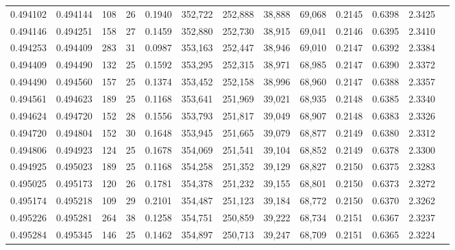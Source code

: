 \begin{tabular}{rrrrrrrrrrrrr}
0.494102 & 0.494144 & 108 &  26 &                                     0.1940 & 352,722 & 252,888 &  38,888 &  69,068 & 0.2145 & 0.6398 & 2.3425 \\
0.494146 & 0.494251 & 158 &  27 &                                     0.1459 & 352,880 & 252,730 &  38,915 &  69,041 & 0.2146 & 0.6395 & 2.3410 \\
0.494253 & 0.494409 & 283 &  31 &                                     0.0987 & 353,163 & 252,447 &  38,946 &  69,010 & 0.2147 & 0.6392 & 2.3384 \\
0.494409 & 0.494490 & 132 &  25 &                                     0.1592 & 353,295 & 252,315 &  38,971 &  68,985 & 0.2147 & 0.6390 & 2.3372 \\
0.494490 & 0.494560 & 157 &  25 &                                     0.1374 & 353,452 & 252,158 &  38,996 &  68,960 & 0.2147 & 0.6388 & 2.3357 \\
0.494561 & 0.494623 & 189 &  25 &                                     0.1168 & 353,641 & 251,969 &  39,021 &  68,935 & 0.2148 & 0.6385 & 2.3340 \\
0.494624 & 0.494720 & 152 &  28 &                                     0.1556 & 353,793 & 251,817 &  39,049 &  68,907 & 0.2148 & 0.6383 & 2.3326 \\
0.494720 & 0.494804 & 152 &  30 &                                     0.1648 & 353,945 & 251,665 &  39,079 &  68,877 & 0.2149 & 0.6380 & 2.3312 \\
0.494806 & 0.494923 & 124 &  25 &                                     0.1678 & 354,069 & 251,541 &  39,104 &  68,852 & 0.2149 & 0.6378 & 2.3300 \\
0.494925 & 0.495023 & 189 &  25 &                                     0.1168 & 354,258 & 251,352 &  39,129 &  68,827 & 0.2150 & 0.6375 & 2.3283 \\
0.495025 & 0.495173 & 120 &  26 &                                     0.1781 & 354,378 & 251,232 &  39,155 &  68,801 & 0.2150 & 0.6373 & 2.3272 \\
0.495174 & 0.495218 & 109 &  29 &                                     0.2101 & 354,487 & 251,123 &  39,184 &  68,772 & 0.2150 & 0.6370 & 2.3262 \\
0.495226 & 0.495281 & 264 &  38 &                                     0.1258 & 354,751 & 250,859 &  39,222 &  68,734 & 0.2151 & 0.6367 & 2.3237 \\
0.495284 & 0.495345 & 146 &  25 &                                     0.1462 & 354,897 & 250,713 &  39,247 &  68,709 & 0.2151 & 0.6365 & 2.3224 \\

\end{tabular}
